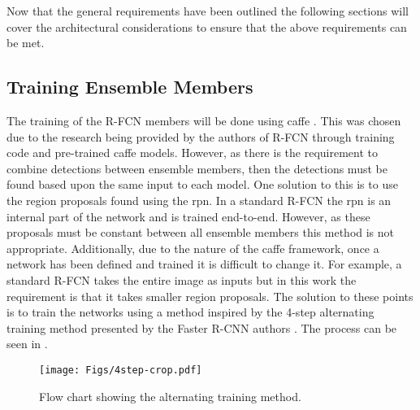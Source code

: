 \documentclass[a4paper,twoside]{article}
\begin{document}
Now that the general requirements have been outlined the following sections will cover the architectural considerations to ensure that the above requirements can be met.

\subsection{Training Ensemble Members}\label{sec:trainens}
The training of the R-FCN members will be done using \gls{caffe} \cite{caffe}. This was chosen due to the research being provided by the authors of R-FCN through training code and pre-trained \gls{caffe} models. However, as there is the requirement to combine detections between ensemble members, then the detections must be found based upon the same input to each model. One solution to this is to use the region proposals found using the \gls{rpn}. In a standard R-FCN the \gls{rpn} is an internal part of the network and is trained end-to-end. However, as these proposals must be constant between all ensemble members this method is not appropriate. Additionally, due to the nature of the \gls{caffe} framework, once a network has been defined and trained it is difficult to change it. For example, a standard R-FCN takes the entire image as inputs but in this work the requirement is that it takes smaller region proposals. The solution to these points is to train the networks using a method inspired by the 4-step alternating training method presented by the Faster R-CNN authors \cite{fasterrcnn}. The process can be seen in .

 \begin{figure*}[!h]
  \centering
    \texttt{[image: Figs/4step-crop.pdf]}
      \caption{Flow chart showing the alternating training method.}
    \label{fig:4steptrain}
\end{figure*}
\end{document}
